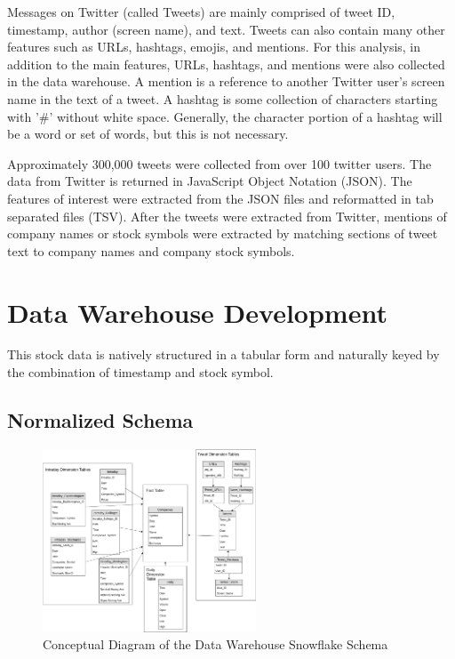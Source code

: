 \documentclass[journal]{IEEEtran}
\begin{document}
Messages on Twitter (called Tweets) are mainly comprised of
 tweet ID, timestamp, author (screen name), and text.
Tweets can also contain many other features such as
 URLs, hashtags, emojis,  and mentions.
For this analysis, in addition to the main features,
 URLs, hashtags, and mentions were also collected in the data warehouse.
A mention is a reference to another Twitter user's screen name
 in the text of a tweet.
A hashtag is some collection of characters starting with
 '\#' without white space.
Generally, the character portion of a hashtag will be a word or set of words,
 but this is not necessary.

Approximately 300,000 tweets were collected from over 100 twitter users.
The data from Twitter is returned in JavaScript Object Notation (JSON).
The features of interest were extracted from the JSON files and
 reformatted in tab separated files (TSV).
After the tweets were extracted from Twitter,
 mentions of company names or stock symbols were extracted by 
 matching sections of tweet text to company names and company stock symbols.


\section{Data Warehouse Development}

This stock data is natively structured in a tabular form and naturally keyed by the combination of timestamp and stock symbol.


\subsection{Normalized Schema}

\begin{figure}
	\centering
	\includegraphics[width=2.5in]{Snowflake_Conceptual_Schema.png}
	\caption{Conceptual Diagram of the Data Warehouse Snowflake Schema}
	\label{snowflake}
\end{figure}
\end{document}
